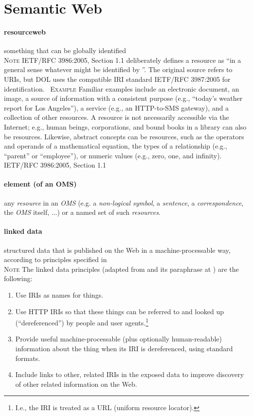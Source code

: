 \documentclass[10pt,%
\ifpretendfinal
final%
\else
draft%
\fi,
]{scrreprt}
\makeatletter
\newcommand*{\eg}{e.g.\@\xspace}
\newcommand*{\termref}[1]{\textit{#1}}
\newcommand*{\subjectfield}[1]{ {\textlangle}#1{\textrangle}}
\newcommand{\sclause}[1]{\section{#1}}
\newcommand{\termdefinition}[2]{\paragraph{#1} #2}
\newcommand{\nisref}[1]{#1}
\renewcommand{\subjectfield}[1]{#1}
\newenvironment{definitions}[0]{\medskip }{}
\newenvironment{note}[0]{\ \\ \textsc{Note} \quad}{}
\newenvironment{example}[0]{\ \newline \textsc{Example}\quad }{}
\makeatother
\begin{document}
\sclause{Semantic Web}\label{c:terms-semantic-web}

\begin{definitions}
  \termdefinition{resource\subjectfield{web}}{something that can be globally identified}
  \begin{note}
    \nisref{IETF/RFC 3986:2005, Section 1.1} deliberately defines a resource as ``in a general sense \textelp{} whatever might be identified by ''.  The original source refers to URIs, but DOL uses the compatible IRI standard \nisref{IETF/RFC 3987:2005} for identification.
  \end{note}
  \begin{example}
Familiar examples include an electronic document, an image, a source of information with a 
consistent purpose (\eg, ``today's weather report for Los Angeles''), a service (\eg, an 
HTTP-to-SMS gateway), and a collection of other resources. A resource is not necessarily accessible 
via the Internet; \eg, human beings, corporations, and bound books in a library can also be 
resources. Likewise, abstract concepts can be resources, such as the operators and operands of a 
mathematical equation, the types of a relationship (\eg, ``parent'' or ``employee''), or numeric 
values (\eg, zero, one, and infinity). \nisref{IETF/RFC 3986:2005, Section 1.1}
  \end{example}
  \termdefinition{element (of an OMS)}{any \termref{resource} in an \termref{OMS} (\eg a \termref{non-logical symbol}, a \termref{sentence}, a \termref{correspondence}, the \termref{OMS} itself, ...) or a named set of such \termref{resources}.}
  
  \termdefinition{linked data}{structured data that is published on the Web in a machine-processable way, according to principles specified in \cite{BernersLee:LinkedData2006,BizerHeath09}}
  \begin{note}
    The linked data principles (adapted from \cite{BernersLee:LinkedData2006} and its paraphrase at \cite{Wikipedia:LinkedData2011}) are the following:
    \begin{enumerate}
    \item Use IRIs as names for things.
    \item Use HTTP IRIs so that these things can be referred to and looked up (``dereferenced'') 
    by people and user agents.\footnote{I.e., the IRI is treated as a URL (uniform resource locator).}
    \item Provide useful machine-processable (plus optionally human-readable) information about the thing when its IRI is dereferenced, using standard formats.
    \item Include links to other, related IRIs in the exposed data to improve discovery of other related information on the Web.
    \end{enumerate}
  \end{note}


\end{definitions}
\end{document}
